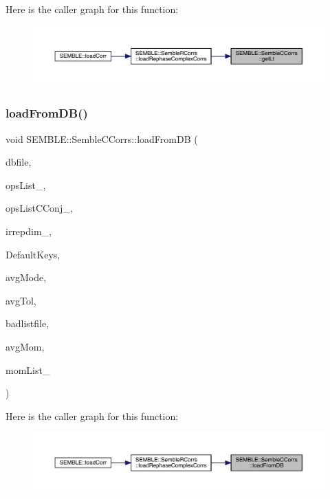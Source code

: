 Here is the caller graph for this function\+:
\nopagebreak
\begin{figure}[H]
\begin{center}
\leavevmode
\includegraphics[width=350pt]{d4/d35/classSEMBLE_1_1SembleCCorrs_aac492c18afa3475a688db0ffa4d27ff6_icgraph}
\end{center}
\end{figure}
\mbox{\label{classSEMBLE_1_1SembleCCorrs_aff77b082f126bb4094553ca6e9309985}} 
\subsubsection{\texorpdfstring{loadFromDB()}{loadFromDB()}\hspace{0.1cm}{\footnotesize\ttfamily [1/2]}}
{\footnotesize\ttfamily void S\+E\+M\+B\+L\+E\+::\+Semble\+C\+Corrs\+::load\+From\+DB (\begin{DoxyParamCaption}\item[{const string \&}]{dbfile,  }\item[{vector$<$ string $>$}]{ops\+List\+\_\+,  }\item[{vector$<$ int $>$}]{ops\+List\+C\+Conj\+\_\+,  }\item[{int}]{irrepdim\+\_\+,  }\item[{F\+F\+::\+Key\+Hadron2\+Pt\+Corr\+\_\+t}]{Default\+Keys,  }\item[{const string \&}]{avg\+Mode,  }\item[{double}]{avg\+Tol,  }\item[{const string \&}]{badlistfile,  }\item[{bool}]{avg\+Mom,  }\item[{vector$<$ Array$<$ int $>$ $>$}]{mom\+List\+\_\+ }\end{DoxyParamCaption})}

Here is the caller graph for this function\+:
\nopagebreak
\begin{figure}[H]
\begin{center}
\leavevmode
\includegraphics[width=350pt]{d4/d35/classSEMBLE_1_1SembleCCorrs_aff77b082f126bb4094553ca6e9309985_icgraph}
\end{center}
\end{figure}
\mbox{\label{classSEMBLE_1_1SembleCCorrs_a9fa9fdd587137bb3434f8d9c329c6561}} 
